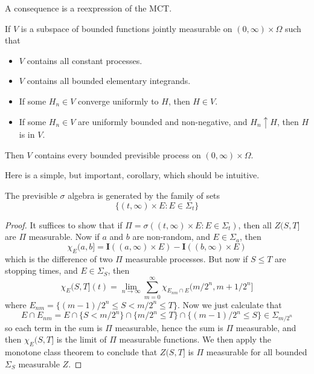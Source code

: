 A consequence is a reexpression of the MCT.

\begin{corollary}
    If $V$ is a subspace of bounded functions jointly measurable on $(0,\infty) \times \Omega$ such that
    \begin{itemize}
        \item $V$ contains all constant processes.
        \item $V$ contains all bounded elementary integrands.
        \item If some $H_n \in V$ converge uniformly to $H$, then $H \in V$.
        \item If some $H_n \in V$ are uniformly bounded and non-negative, and $H_n \uparrow H$, then $H$ is in $V$.
    \end{itemize}
    Then $V$ contains every bounded previsible process on $(0,\infty) \times \Omega$.
\end{corollary}

Here is a simple, but important, corollary, which should be intuitive.

\begin{theorem}
    The previsible $\sigma$ algebra is generated by the family of sets
    \[ \{ (t, \infty) \times E : E \in \Sigma_t \} \]
\end{theorem}
\begin{proof}
    It suffices to show that if $\Pi = \sigma((t, \infty) \times E: E \in \Sigma_t)$, then all $Z(S,T]$ are $\Pi$ measurable. Now if $a$ and $b$ are non-random, and $E \in \Sigma_a$, then
    \[ \chi_E (a,b] = \mathbf{I}((a,\infty) \times E) - \mathbf{I}((b,\infty) \times E) \]
    which is the difference of two $\Pi$ measurable processes. But now if $S \leq T$ are stopping times, and $E \in \Sigma_S$, then
    \[ \chi_E(S,T](t) = \lim_{n \to \infty} \sum_{m = 0}^\infty \chi_{E_{nm} \cap E} (m/2^n, m+1/2^n] \]
    where $E_{nm} = \{ (m-1)/2^n \leq S < m/2^n \leq T \}$. Now we just calculate that
    \[ E \cap E_{nm} = E \cap \{ S < m/2^n \} \cap \{ m/2^n \leq T \} \cap \{ (m-1)/2^n \leq S \} \in \Sigma_{m/2^n} \]
    so each term in the sum is $\Pi$ measurable, hence the sum is $\Pi$ measurable, and then $\chi_E(S,T]$ is the limit of $\Pi$ measurable functions. We then apply the monotone class theorem to conclude that $Z(S,T]$ is $\Pi$ measurable for all bounded $\Sigma_S$ measurable $Z$.
\end{proof}

